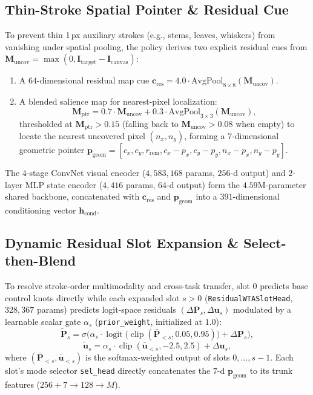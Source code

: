 \documentclass[10pt,twocolumn]{article}
\begin{document}
\subsection{Thin-Stroke Spatial Pointer \& Residual Cue}
To prevent thin 1\,px auxiliary strokes (e.g., stems, leaves, whiskers) from vanishing under spatial pooling, the policy derives two explicit residual cues from $\mathbf{M}_{\text{uncov}} = \max(0, \mathbf{I}_{\text{target}} - \mathbf{I}_{\text{canvas}})$:
\begin{enumerate}
    \item A $64$-dimensional residual map cue $\mathbf{c}_{\text{res}} = 4.0 \cdot \text{AvgPool}_{8\times 8}(\mathbf{M}_{\text{uncov}})$.
    \item A blended salience map for nearest-pixel localization:
    \begin{equation}
        \mathbf{M}_{\text{ptr}} = 0.7 \cdot \mathbf{M}_{\text{uncov}} + 0.3 \cdot \text{AvgPool}_{3\times 3}(\mathbf{M}_{\text{uncov}}),
    \end{equation}
    thresholded at $\mathbf{M}_{\text{ptr}} > 0.15$ (falling back to $\mathbf{M}_{\text{uncov}} > 0.08$ when empty) to locate the nearest uncovered pixel $(n_x, n_y)$, forming a $7$-dimensional geometric pointer $\mathbf{p}_{\text{geom}} = [c_x, c_y, r_{\text{rem}}, c_x - p_x, c_y - p_y, n_x - p_x, n_y - p_y]$.
\end{enumerate}
The $4$-stage ConvNet visual encoder ($4{,}583{,}168$ params, $256$-d output) and $2$-layer MLP state encoder ($4{,}416$ params, $64$-d output) form the $4.59\text{M}$-parameter shared backbone, concatenated with $\mathbf{c}_{\text{res}}$ and $\mathbf{p}_{\text{geom}}$ into a $391$-dimensional conditioning vector $\mathbf{h}_{\text{cond}}$.

\subsection{Dynamic Residual Slot Expansion \& Select-then-Blend}
To resolve stroke-order multimodality and cross-task transfer, slot $0$ predicts base control knots directly while each expanded slot $s > 0$ (\texttt{ResidualWTASlotHead}, $328{,}367$ params) predicts logit-space residuals $(\Delta \mathbf{P}_s, \Delta \mathbf{u}_s)$ modulated by a learnable scalar gate $\alpha_s$ (\texttt{prior\_weight}, initialized at $1.0$):
\begin{equation}
    \tilde{\mathbf{P}}_s = \sigma\!\Big(\alpha_s \cdot \operatorname{logit}\big(\operatorname{clip}(\bar{\mathbf{P}}_{<s}, 0.05, 0.95)\big) + \Delta \mathbf{P}_s\Big),
\end{equation}
\begin{equation}
    \tilde{\mathbf{u}}_s = \alpha_s \cdot \operatorname{clip}(\bar{\mathbf{u}}_{<s}, -2.5, 2.5) + \Delta \mathbf{u}_s,
\end{equation}
where $(\bar{\mathbf{P}}_{<s}, \bar{\mathbf{u}}_{<s})$ is the softmax-weighted output of slots $0, \dots, s-1$. Each slot's mode selector \texttt{sel\_head} directly concatenates the $7$-d $\mathbf{p}_{\text{geom}}$ to its trunk features ($256 + 7 \rightarrow 128 \rightarrow M$).
\end{document}
